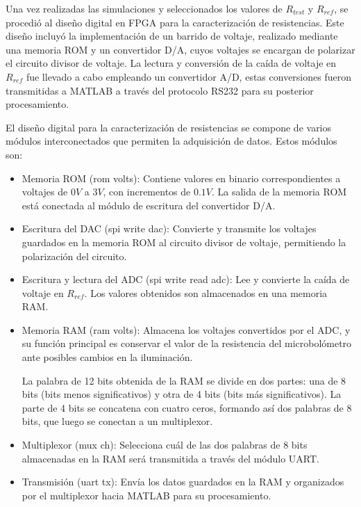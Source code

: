 Una vez realizadas las simulaciones y seleccionados los valores de $R_{test}$ y $R_{ref}$, se procedió al diseño digital en FPGA para la caracterización de resistencias. Este diseño incluyó la implementación de un barrido de voltaje, realizado mediante una memoria ROM y un convertidor D/A, cuyos voltajes se encargan de polarizar el circuito divisor de voltaje. La lectura y conversión de la caída de voltaje en $R_{ref}$ fue llevado a cabo empleando un convertidor A/D, estas conversiones fueron transmitidas a MATLAB a través del protocolo RS232 para su posterior procesamiento.


El diseño digital para la caracterización de resistencias se compone de varios módulos interconectados que permiten la adquisición de datos.
Estos módulos son:


\begin{itemize}
    \item Memoria ROM (rom volts): Contiene valores en binario correspondientes a voltajes de $0V$ a $3V$, con incrementos de $0.1V$. La salida de la memoria ROM está conectada al módulo de escritura del convertidor D/A.

    \item Escritura del DAC (spi write dac): Convierte y transmite los voltajes guardados en la memoria ROM al circuito divisor de voltaje, permitiendo la polarización del circuito.

    \item Escritura y lectura del ADC (spi write read adc): Lee y convierte la caída de voltaje en $R_{ref}$. Los valores obtenidos son almacenados en una memoria RAM.

    \item Memoria RAM (ram volts): Almacena los voltajes convertidos por el ADC, y su función principal es conservar el valor de la resistencia del microbolómetro ante posibles cambios en la iluminación.
    
    La palabra de 12 bits obtenida de la RAM se divide en dos partes: una de 8 bits (bits menos significativos) y otra de 4 bits (bits más significativos). La parte de 4 bits se concatena con cuatro ceros, formando así dos palabras de 8 bits, que luego se conectan a un multiplexor.
    

    \item Multiplexor (mux ch): Selecciona cuál de las dos palabras de 8 bits almacenadas en la RAM será transmitida a través del módulo UART.


    \item Transmisión (uart tx): Envía los datos guardados en la RAM y organizados por el multiplexor hacia MATLAB para su procesamiento.


\end{itemize}
